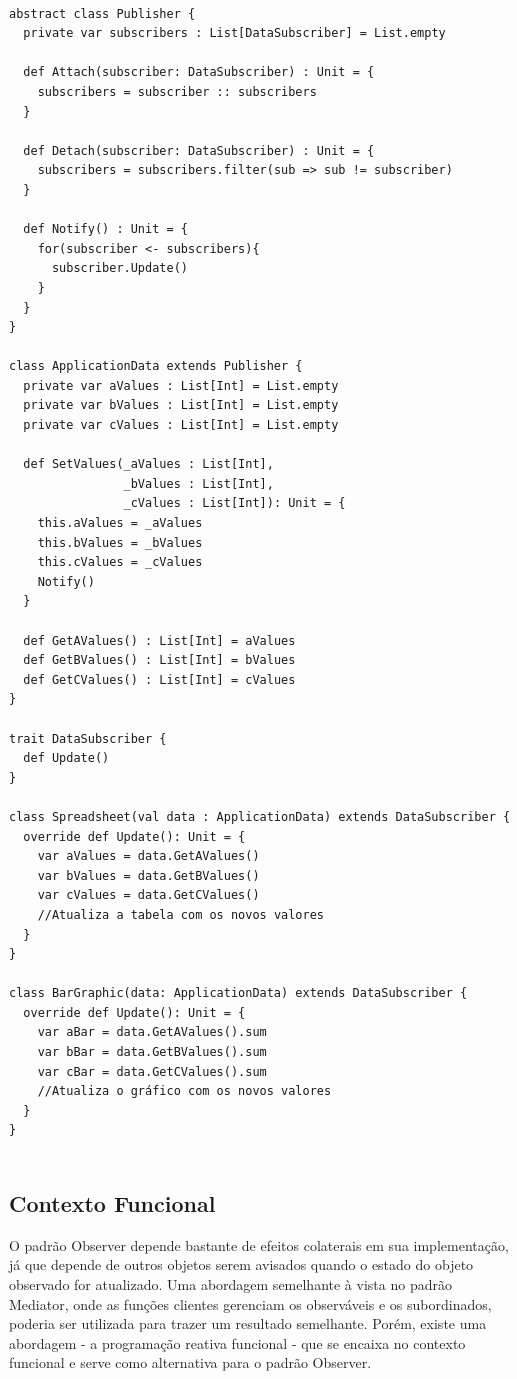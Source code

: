 \begin{lstlisting}[caption={Observer Orientação a Objetos},label=ooobserver]

abstract class Publisher {
  private var subscribers : List[DataSubscriber] = List.empty

  def Attach(subscriber: DataSubscriber) : Unit = {
    subscribers = subscriber :: subscribers
  }

  def Detach(subscriber: DataSubscriber) : Unit = {
    subscribers = subscribers.filter(sub => sub != subscriber)
  }

  def Notify() : Unit = {
    for(subscriber <- subscribers){
      subscriber.Update()
    }
  }
}

class ApplicationData extends Publisher {
  private var aValues : List[Int] = List.empty
  private var bValues : List[Int] = List.empty
  private var cValues : List[Int] = List.empty

  def SetValues(_aValues : List[Int],
                _bValues : List[Int],
                _cValues : List[Int]): Unit = {
    this.aValues = _aValues
    this.bValues = _bValues
    this.cValues = _cValues
    Notify()
  }

  def GetAValues() : List[Int] = aValues
  def GetBValues() : List[Int] = bValues
  def GetCValues() : List[Int] = cValues
}

trait DataSubscriber {
  def Update()
}

class Spreadsheet(val data : ApplicationData) extends DataSubscriber {
  override def Update(): Unit = {
    var aValues = data.GetAValues()
    var bValues = data.GetBValues()
    var cValues = data.GetCValues()
    //Atualiza a tabela com os novos valores
  }
}

class BarGraphic(data: ApplicationData) extends DataSubscriber {
  override def Update(): Unit = {
    var aBar = data.GetAValues().sum
    var bBar = data.GetBValues().sum
    var cBar = data.GetCValues().sum
    //Atualiza o gráfico com os novos valores
  }
}
    
\end{lstlisting}

\subsection*{Contexto Funcional}

O padrão Observer depende bastante de 
efeitos colaterais em sua implementação, 
já que depende de outros objetos serem avisados 
quando o estado do objeto observado for 
atualizado. Uma abordagem semelhante à vista 
no padrão Mediator, onde as funções clientes 
gerenciam os observáveis e os subordinados, 
poderia ser utilizada para trazer um resultado 
semelhante. Porém, existe uma abordagem - a 
programação reativa funcional - que se encaixa 
no contexto funcional e serve como alternativa 
para o padrão Observer\cite{reactiveprog}.

